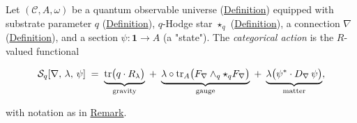 \begin{definition}
  \label{def:categorical-action}
Let $(\mathcal{C}, A, \omega)$ be a quantum observable universe
(\hyperref[def:quantum-observable-universe]{Definition}) equipped with
substrate parameter $q$ (\hyperref[def:substrate-parameter]{Definition}),
$q$-Hodge star $\star_q$ (\hyperref[def:q-hodge-star]{Definition}),
a connection $\nabla$ (\hyperref[def:categorical-connection]{Definition}),
and a section $\psi \colon \mathbf{1} \to A$ (a "state").
The \emph{categorical action} is the $R$-valued functional

\begin{equation}\label{eq:categorical-action}
  \mathcal{S}_q[\nabla,\, \lambda,\, \psi]
  \;=\;
  \underbrace{%
    \mathrm{tr}\bigl(q \cdot R_\lambda\bigr)
  }_{\text{gravity}}
  \;+\;
  \underbrace{%
    \lambda \circ \mathrm{tr}_A\bigl(
      F_\nabla \wedge_q \star_q F_\nabla
    \bigr)
  }_{\text{gauge}}
  \;+\;
  \underbrace{%
    \lambda\bigl(\psi^* \cdot D_\nabla\,\psi\bigr)
  }_{\text{matter}},
\end{equation}

with notation as in \hyperref[rem:categorical-action-notation]{Remark}.
\end{definition}

